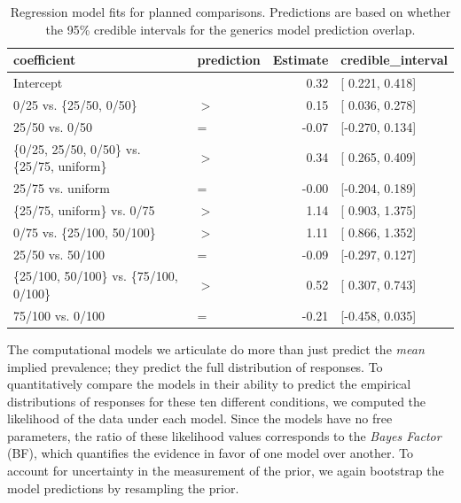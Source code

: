 \documentclass[floatsintext,doc]{apa6}
\theoremstyle{definition}
\theoremstyle{definition}
\theoremstyle{definition}
\theoremstyle{remark}
\begin{document}
\begin{table}[h]
\centering
\begingroup\fontsize{9pt}{10pt}\selectfont
\begin{tabular}{llrl}
  \hline
coefficient & prediction & Estimate & credible\_interval \\ 
  \hline
Intercept &  & 0.32 & [ 0.221, 0.418] \\ 
  0/25 vs. \{25/50, 0/50\} & $>$ & 0.15 & [ 0.036, 0.278] \\ 
  25/50 vs. 0/50 & = & -0.07 & [-0.270, 0.134] \\ 
  \{0/25, 25/50, 0/50\} vs. \{25/75, uniform\} & $>$ & 0.34 & [ 0.265, 0.409] \\ 
  25/75 vs. uniform & = & -0.00 & [-0.204, 0.189] \\ 
  \{25/75, uniform\} vs. 0/75 & $>$ & 1.14 & [ 0.903, 1.375] \\ 
  0/75 vs. \{25/100, 50/100\} & $>$ & 1.11 & [ 0.866, 1.352] \\ 
  25/50 vs. 50/100 & = & -0.09 & [-0.297, 0.127] \\ 
  \{25/100, 50/100\} vs. \{75/100, 0/100\} & $>$ & 0.52 & [ 0.307, 0.743] \\ 
  75/100 vs. 0/100 & = & -0.21 & [-0.458, 0.035] \\ 
   \hline
\end{tabular}
\endgroup
\caption{Regression model fits for planned comparisons. Predictions are based on whether the 95\% credible intervals for the generics model prediction overlap.} 
\end{table}

The computational models we articulate do more than just predict the
\emph{mean} implied prevalence; they predict the full distribution of
responses. To quantitatively compare the models in their ability to
predict the empirical distributions of responses for these ten different
conditions, we computed the likelihood of the data under each model.
Since the models have no free parameters, the ratio of these likelihood
values corresponds to the \emph{Bayes Factor} (BF), which quantifies the
evidence in favor of one model over another. To account for uncertainty
in the measurement of the prior, we again bootstrap the model
predictions by resampling the prior.
\end{document}
